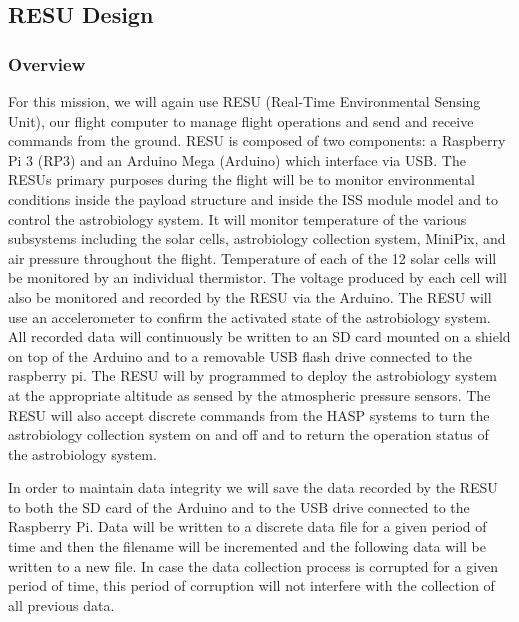 \subsection{RESU Design}
\label{sec:ElectronicsDesign}

\subsubsection{Overview}

For this mission, we will again use RESU (Real-Time Environmental Sensing Unit), our flight computer to manage flight operations and send and receive commands from the ground. RESU is composed of two components: a Raspberry Pi 3 (RP3) and an Arduino Mega (Arduino) which interface via USB. The RESUs primary purposes during the flight will be to monitor environmental conditions inside the payload structure and inside the ISS module model and to control the astrobiology system. It will monitor temperature of the various subsystems including the solar cells, astrobiology collection system, MiniPix, and air pressure throughout the flight. Temperature of each of the 12 solar cells will be monitored by an individual thermistor. The voltage produced by each cell will also be monitored and recorded by the RESU via the Arduino. The RESU will use an accelerometer to confirm the activated state of the astrobiology system. All recorded data will continuously be written to an SD card mounted on a shield on top of the Arduino and to a removable USB flash drive connected to the raspberry pi. The RESU will by programmed to deploy the astrobiology system at the appropriate altitude as sensed by the atmospheric pressure sensors. The RESU will also accept discrete commands from the HASP systems to turn the astrobiology collection system on and off and to return the operation status of the astrobiology system.

\iffalse
 During our last flight we only had one mechanism for storing data with no redundancy. This means that if one of our storage devices had been damaged or corrupted during flight, all of our data would have been lost. In order to harden our payload and ensure the safety of our data we will now store redundant copies of our data. One will be stored on the SD card directly on the Arduino and the other will be transferred to the RP3 for storage.
\fi

In order to maintain data integrity we will save the data recorded by the RESU to both the SD card of the Arduino and to the USB drive connected to the Raspberry Pi. Data will be written to a discrete data file for a given period of time and then the filename will be incremented and the following data will be written to a new file. In case the data collection process is corrupted for a given period of time, this period of corruption will not interfere with the collection of all previous data.

